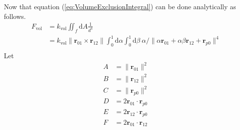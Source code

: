 \documentclass[main.tex]{subfiles}
\begin{document}
Now that equation (\ref{eq:VolumeExclusionIntegral}) can be done analytically as follows.
\begin{equation}
\begin{aligned}
F_\text{vol} &= k_\text{vol} \iint_f \mathrm{d}A \frac1{d^4}\\
&= k_\text{vol} \| \bm{r}_{01} \times \bm{r}_{12} \| \int_0^1 \mathrm{d}\alpha \int_0^1 \mathrm{d}\beta \ \alpha / \| \alpha\bm{r}_{01} + \alpha\beta\bm{r}_{12} + \bm{r}_{p0} \|^4\\
\end{aligned}
\end{equation}
Let
\begin{equation}
\begin{aligned}
A &= \|\bm{r}_{01}\|^2\\
B &= \|\bm{r}_{12}\|^2\\
C &= \|\bm{r}_{p0}\|^2\\
D &= 2\bm{r}_{01}\cdot\bm{r}_{p0}\\
E &= 2\bm{r}_{12}\cdot\bm{r}_{p0}\\
F &= 2\bm{r}_{01}\cdot\bm{r}_{12}
\end{aligned}
\end{equation}
\end{document}
